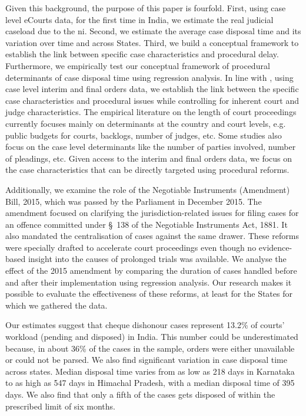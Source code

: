 Given this background, the purpose of this paper is fourfold. First, using case level eCourts data, for the first time in India, we estimate the real judicial caseload due to the \gls{ni}. Second, we estimate the average case disposal time and its variation over time and across States. Third, we build a conceptual framework to establish the link between specific case characteristics and procedural delay. Furthermore, we empirically test our conceptual framework of procedural determinants of case disposal time using regression analysis. In line with \cite{bielen2015}, using case level interim and final orders data, we establish the link between the specific case characteristics and procedural issues while controlling for inherent court and judge characteristics. The empirical literature on the length of court proceedings currently focuses mainly on determinants at the country and court levels, e.g. public budgets for courts, backlogs, number of judges, etc. Some studies also focus on the case level determinants like the number of parties involved, number of pleadings, etc. Given access to the interim and final orders data, we focus on the case characteristics that can be directly targeted using procedural reforms.

Additionally, we examine the role of the Negotiable Instruments (Amendment) Bill, 2015, which was passed by the Parliament in December 2015. The amendment focused on clarifying the jurisdiction-related issues for filing cases for an offence committed under \S~138 of the Negotiable Instruments Act, 1881. It also mandated the centralisation of cases against the same drawer. These reforms were specially drafted to accelerate court proceedings even though no evidence-based insight into the causes of prolonged trials was available. We analyse the effect of the 2015 amendment by comparing the duration of cases handled before and after their implementation using regression analysis. Our research makes it possible to evaluate the effectiveness of these reforms, at least for the States for which we gathered the data.

Our estimates suggest that cheque dishonour cases represent 13.2\% of courts' workload (pending and disposed) in India. This number could be underestimated because, in about 36\% of the cases in the sample, orders were either unavailable or could not be parsed. We also find significant variation in case disposal time across states. Median disposal time varies from as low as 218 days in Karnataka to as high as 547 days in Himachal Pradesh, with a median disposal time of 395 days. We also find that only a fifth of the cases gets disposed of within the prescribed limit of six months.

